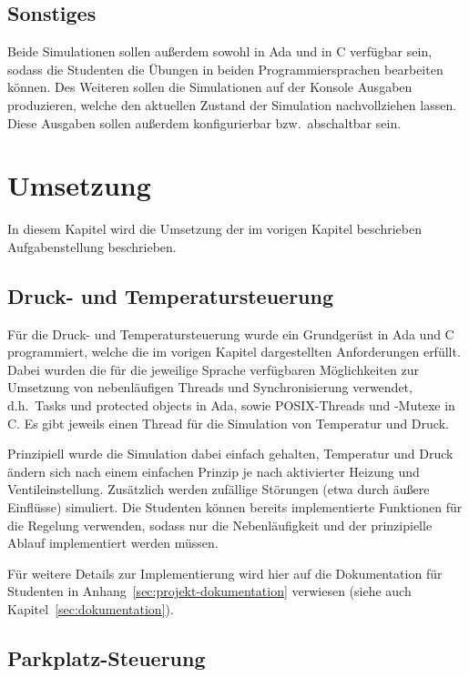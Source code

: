 \documentclass[oneside]{elaboration}
\begin{document}
\section{Sonstiges}
\label{sec:sonstiges}

Beide Simulationen sollen außerdem sowohl in Ada und in C verfügbar sein, sodass
die Studenten die Übungen in beiden Programmiersprachen bearbeiten können.
Des Weiteren sollen die Simulationen auf der Konsole Ausgaben produzieren,
welche den aktuellen Zustand der Simulation nachvollziehen lassen. Diese
Ausgaben sollen außerdem konfigurierbar bzw.\ abschaltbar sein.

\chapter{Umsetzung}
\label{chp:umsetzung}

In diesem Kapitel wird die Umsetzung der im vorigen Kapitel beschrieben
Aufgabenstellung beschrieben.

\section{Druck- und Temperatursteuerung}
\label{sec:druck-_und_temperatursteuerung}

Für die Druck- und Temperatursteuerung wurde ein Grundgerüst in Ada und C
programmiert, welche die im vorigen Kapitel dargestellten Anforderungen erfüllt.
Dabei wurden die für die jeweilige Sprache verfügbaren Möglichkeiten zur
Umsetzung von nebenläufigen Threads und Synchronisierung verwendet, d.h.\ Tasks
und protected objects in Ada, sowie POSIX-Threads und -Mutexe in C. Es gibt
jeweils einen Thread für die Simulation von Temperatur und Druck.

Prinzipiell wurde die Simulation dabei einfach gehalten, Temperatur und Druck
ändern sich nach einem einfachen Prinzip je nach aktivierter Heizung und
Ventileinstellung. Zusätzlich werden zufällige Störungen (etwa durch äußere
Einflüsse) simuliert. Die Studenten können bereits implementierte Funktionen für
die Regelung verwenden, sodass nur die Nebenläufigkeit und der prinzipielle
Ablauf implementiert werden müssen.

Für weitere Details zur Implementierung wird hier auf die Dokumentation für
Studenten in Anhang~\ref{sec:projekt-dokumentation} verwiesen (siehe auch
Kapitel~\ref{sec:dokumentation}).

\section{Parkplatz-Steuerung}
\label{sec:parkplatz-steuerung}
\end{document}
